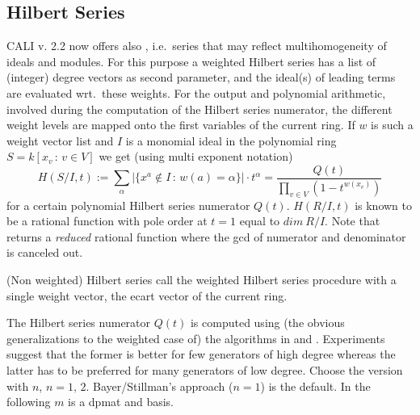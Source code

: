 \subsection{Hilbert Series}

CALI v. 2.2 now offers also , i.e.\
series that may reflect multihomogeneity of ideals and modules. For
this purpose 
a weighted Hilbert series has a list of (integer) degree vectors
as second parameter, and the ideal(s) of leading terms are evaluated
wrt.\ these weights. For the output and polynomial arithmetic,
involved during the computation of the Hilbert series numerator, the
different weight levels are mapped onto the first variables of the
current ring. If $w$ is such a weight vector list and $I$ is a
monomial ideal in the polynomial ring $S=k[x_v\,:\,v\in V]$ we get
(using multi exponent notation) 
\[H(S/I,t) := \sum_{\alpha}{|\{x^a\not\in I\,:\,w(a)=\alpha\}|\cdot
t^\alpha} = \frac{Q(t)}{\prod_{v\in V}{\left(1-t^{w(x_v)}\right)} }\]
for a certain polynomial Hilbert series numerator $Q(t)$. $H(R/I,t)$
is known to be a rational function with pole order at $t=1$ equal to
$dim\ R/I$. Note that \ind{WeightedHilbertSeries} returns a {\em
reduced} rational function where the gcd of numerator and denominator
is canceled out. 

(Non weighted) Hilbert series call the weighted Hilbert series
procedure with a single weight vector, the ecart vector of the current
ring.   

The Hilbert series numerator $Q(t)$ is computed using (the obvious
generalizations to the weighted case of) the algorithms in \cite{BS}
and \cite{BCRT}. Experiments suggest that the former is better for few
generators of high degree whereas the latter has to be preferred for
many generators of low degree. Choose the version with
 $n$, $n=1,\,2$. Bayer/Stillman's approach ($n=1$)
is the default. In the following $m$ is a dpmat and \gr basis.

